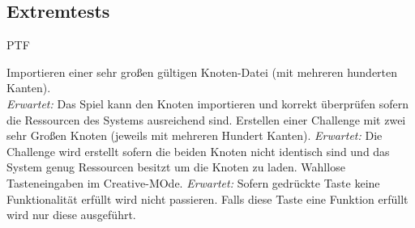 \clearpage


%
%
\subsection{Extremtests}

	\begin{ids}{\gls{PTF}}
	
		\id[1000] Importieren einer sehr großen gültigen Knoten-Datei (mit mehreren hunderten Kanten).\\
		\textit{Erwartet:} Das Spiel kann den Knoten importieren und korrekt überprüfen sofern die Ressourcen des Systems ausreichend sind.
		\id[1010] Erstellen einer Challenge mit zwei sehr Großen Knoten (jeweils mit mehreren Hundert Kanten).
		\textit{Erwartet:} Die Challenge wird erstellt sofern die beiden Knoten nicht identisch sind und das System genug Ressourcen besitzt um die Knoten zu laden.
		\id[1020] Wahllose Tasteneingaben im Creative-MOde.
		\textit{Erwartet:} Sofern gedrückte Taste keine Funktionalität erfüllt wird nicht passieren. Falls diese Taste eine Funktion erfüllt wird nur diese ausgeführt.
	
	\end{ids}




%
%
%
